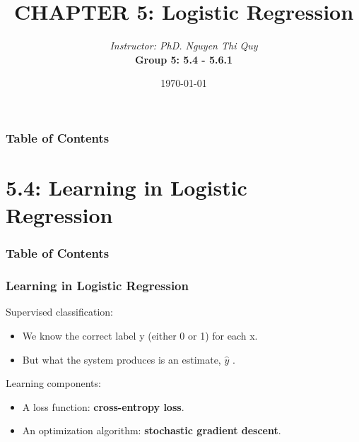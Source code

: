 \documentclass[13.5pt,aspecratio=169]{beamer}
\title{CHAPTER 5: Logistic Regression}
\author[Group 5]{\textit{Instructor: PhD. Nguyen Thi Quy}\\ \bigskip \textbf{Group 5: 5.4 - 5.6.1}}
\date{\today}
\begin{document}
\maketitle

\begin{frame}
	\frametitle{Table of Contents} %
	\tableofcontents[subsectionstyle=hide]
\end{frame}

\section{5.4: Learning in Logistic Regression}
\begin{frame}
	\frametitle{Table of Contents} %
	\tableofcontents[currentsection, subsectionstyle=hide]
\end{frame}

\begin{frame}
    \frametitle{{Learning in Logistic Regression}}
     {\begin{block}{Supervised classification:}
        \begin{itemize}
            \item We know the correct label \color{blue} y \color{black} (either 0 or 1) for each x. 
            \item But what the system produces is an estimate, \color{blue} $\hat{y}$ \color{black} .
        \end{itemize}
    \end{block}}
    \bigskip
     {
        \begin{block}{\Large Learning components:}
            \begin{itemize}
                \item A loss function: \textbf{cross-entropy loss}.
                \item An optimization algorithm: \textbf{stochastic gradient descent}.
            \end{itemize}
        \end{block}
    }
\end{frame}
\end{document}
